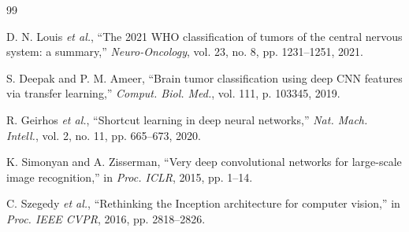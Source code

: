 \documentclass[letterpaper, 10 pt, conference]{ieeeconf}
\begin{document}
\begin{thebibliography}{99}

 D. N. Louis \textit{et al.}, ``The 2021 WHO classification of tumors of the central nervous system: a summary,'' \textit{Neuro-Oncology}, vol. 23, no. 8, pp. 1231--1251, 2021.

 S. Deepak and P. M. Ameer, ``Brain tumor classification using deep CNN features via transfer learning,'' \textit{Comput. Biol. Med.}, vol. 111, p. 103345, 2019.

 R. Geirhos \textit{et al.}, ``Shortcut learning in deep neural networks,'' \textit{Nat. Mach. Intell.}, vol. 2, no. 11, pp. 665--673, 2020.

 K. Simonyan and A. Zisserman, ``Very deep convolutional networks for large-scale image recognition,'' in \textit{Proc. ICLR}, 2015, pp. 1--14.

 C. Szegedy \textit{et al.}, ``Rethinking the Inception architecture for computer vision,'' in \textit{Proc. IEEE CVPR}, 2016, pp. 2818--2826.

\end{thebibliography}
\end{document}

